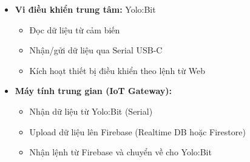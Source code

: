 \begin{itemize}

    \item \textbf{Vi điều khiển trung tâm:} Yolo:Bit
          \begin{itemize}
              \item Đọc dữ liệu từ cảm biến
              \item Nhận/gửi dữ liệu qua Serial USB-C
              \item Kích hoạt thiết bị điều khiển theo lệnh từ Web
          \end{itemize}

    \item \textbf{Máy tính trung gian (IoT Gateway):}
          \begin{itemize}
              \item Nhận dữ liệu từ Yolo:Bit (Serial)
              \item Upload dữ liệu lên Firebase (Realtime DB hoặc Firestore)
              \item Nhận lệnh từ Firebase và chuyển về cho Yolo:Bit
          \end{itemize}



\end{itemize}
